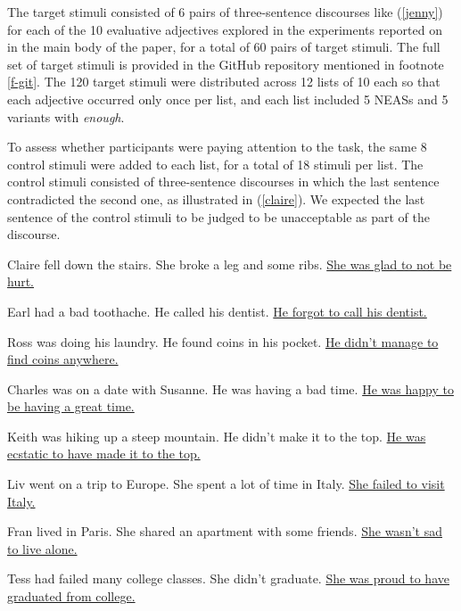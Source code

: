 \documentclass[11pt,fleqn]{article}
\newcommand{\6}{\mbox{$[\hspace*{-.6mm}[$}}
\newcommand{\9}{\mbox{$]\hspace*{-.6mm}]$}}
\begin{document}
The target stimuli consisted of 6 pairs of three-sentence discourses like (\ref{jenny}) for each of the 10 evaluative adjectives explored in the experiments reported on in the main body of the paper, for a total of 60 pairs of target stimuli. The full set of target stimuli is provided in the GitHub repository mentioned in footnote \ref{f-git}. The 120 target stimuli were distributed across 12 lists of 10 each so that each adjective occurred only once per list, and each list included 5 NEASs and 5 variants with {\em enough}. 

To assess whether participants were paying attention to the task, the same 8 control stimuli were added to each list, for a total of 18 stimuli per list. The control stimuli consisted of three-sentence discourses in
which the last sentence contradicted the second one, as illustrated in
(\ref{claire}). We expected the last sentence of the control stimuli to be judged to be unacceptable as part of the discourse.

\begin{exe} 
\ex\label{claire} 
\begin{xlist}
\ex Claire fell down the stairs. She broke a leg and some ribs. \uline{She was glad to not be hurt.} 

\ex Earl had a bad toothache. He called his dentist. \uline{He forgot to call his dentist.}

\ex Ross was doing his laundry. He found coins in his pocket. \uline{He didn't manage to find coins anywhere.}

\ex Charles was on a date with Susanne. He was having a bad time. \uline{He was happy to be having a great time.}

\ex Keith was hiking up a steep mountain. He didn't make it to the top. \uline{He was ecstatic to have made it to the top.}

\ex Liv went on a trip to Europe. She spent a lot of time in Italy. \uline{She failed to visit Italy.}

\ex Fran lived in Paris. She shared an apartment with some friends. \uline{She wasn't sad to live alone.}

\ex Tess had failed many college classes. She didn't graduate. \uline{She was proud to have graduated from college.}

\end{xlist}
\end{exe}
\end{document}
